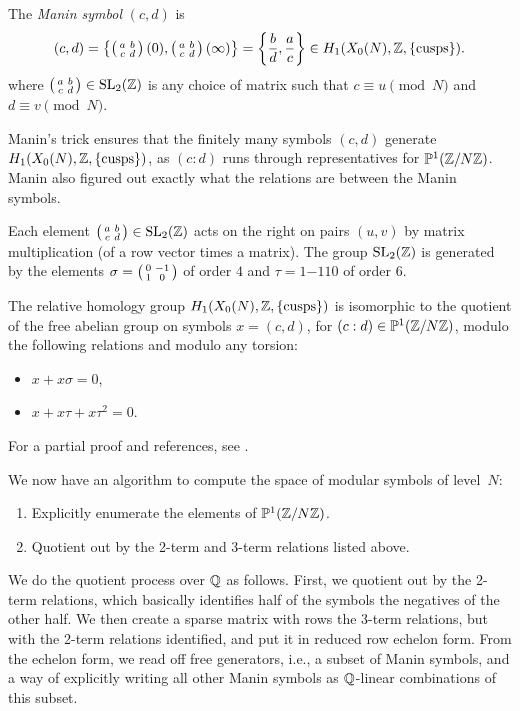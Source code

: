 \documentclass{book}
\begin{document}
The {\em Manin symbol} $(c,d)$ is
$$
  (c,d) = \left\{\left( \begin{smallmatrix}a&b\\c&d\end{smallmatrix}\right)(0), \left( \begin{smallmatrix}a&b\\c&d\end{smallmatrix}\right)(\infty)\right\}
      = \left\{\frac{b}{d}, \frac{a}{c}\right\}
       \in H_1(X_0(N),\mathbb{Z},\{\text{cusps}\}).
$$
where $\left( \begin{smallmatrix}a&b\\c&d\end{smallmatrix}\right)\in\operatorname{SL}_2(\mathbb{Z})$ is any choice of matrix
such that $c\equiv u\pmod{N}$ and $d\equiv v\pmod{N}$.

Manin's trick ensures that the finitely many
symbols $(c,d)$ generate
$H_1(X_0(N),\mathbb{Z},\{\text{cusps}\})$, as
$(c:d)$ runs through representatives for $\mathbb{P}^1(\mathbb{Z}/N\mathbb{Z})$.
Manin also figured out exactly what the relations are
between the Manin symbols.

Each element $\left( \begin{smallmatrix}a&b\\c&d\end{smallmatrix}\right)\in \operatorname{SL}_2(\mathbb{Z})$ acts on the
right on pairs $(u,v)$ by matrix multiplication (of a row vector times a matrix).   The group $\operatorname{SL}_2(\mathbb{Z})$ is generated
by the elements $\sigma=\left( \begin{smallmatrix}0&-1\\1&0\end{smallmatrix}\right)$ of order $4$
and $\tau={1}{-1}{1}{0}$ of order $6$.

\begin{theorem}[Manin]
The relative homology group $H_1(X_0(N),\mathbb{Z},\{\text{cusps}\})$
is isomorphic to the quotient of the free abelian group on
symbols $x=(c,d)$, for $(c:d) \in \mathbb{P}^1(\mathbb{Z}/N\mathbb{Z})$,
modulo the following relations and modulo any torsion:
\begin{itemize}
\item $x + x\sigma = 0$,
\item $x + x\tau + x\tau^2 = 0$.
\end{itemize}
\end{theorem}
For a partial proof and references,
see \cite[Thm.~3.13]{stein:modform}.

We now have an algorithm to compute the space of modular symbols
of level~$N$:
\begin{enumerate}
\item Explicitly enumerate the elements of $\mathbb{P}^1(\mathbb{Z}/N\mathbb{Z})$.
\item Quotient out by the 2-term and 3-term relations listed above.
\end{enumerate}

We do the quotient process over $\mathbb{Q}$ as follows. First, we quotient out
by the 2-term relations, which basically identifies half of the
symbols the negatives of the other half.  We then create a sparse
matrix with rows the 3-term relations, but with the 2-term
relations identified, and put it in reduced row echelon form.
From the echelon form, we read off free generators, i.e.,
a subset of Manin symbols, and a way of explicitly writing all
other Manin symbols as $\mathbb{Q}$-linear combinations of this subset.
\end{document}
